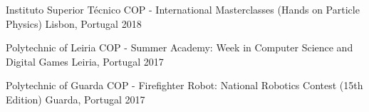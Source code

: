 

\begin{cvhonors}

  \cvhonor
    {Instituto Superior Técnico} %
    {COP - International Masterclasses (Hands on Particle Physics)} %
    {Lisbon, Portugal} %
    {2018} %

  \cvhonor
    {Polytechnic of Leiria} %
    {COP - Summer Academy: Week in Computer Science and Digital Games} %
    {Leiria, Portugal} %
    {2017} %

  \cvhonor
    {Polytechnic of Guarda} %
    {COP - Firefighter Robot: National Robotics Contest (15th Edition)} %
    {Guarda, Portugal} %
    {2017} %

\end{cvhonors}
